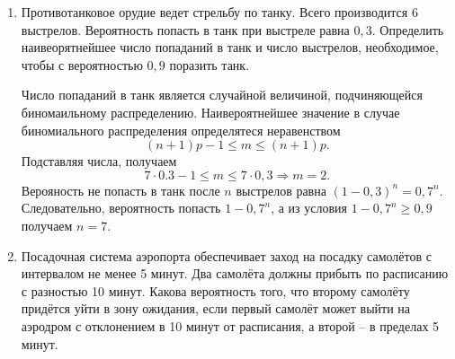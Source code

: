 \begin{enumerate}
    \item Противотанковое орудие ведет стрельбу по танку. Всего производится 6
        выстрелов. Вероятность попасть в танк при выстреле равна \( 0,3 \).
        Определить наивеорятнейшее число попаданий в танк и число выстрелов,
        необходимое, чтобы с вероятностью \( 0,9 \) поразить танк.

        Число попаданий в танк является случайной величиной, подчиняющейся
        биномаильному распределению. Наивероятнейшее значение в случае
        биномиального распределения определятеся неравенством
        \[
            (n+1)p - 1 \le m \le (n+1)p.
        \]
        Подставляя числа, получаем
        \[
            7\cdot0.3 - 1 \le m \le 7\cdot0,3 \Rightarrow m = 2.
        \]
        Верояность не попасть в танк после \( n \) выстрелов равна
        \( (1 - 0,3)^n = 0,7^n \). Следовательно, вероятность попасть
        \( 1 - 0,7^n \), а из условия \( 1 - 0,7^n \ge 0,9 \) получаем
        \( n = 7 \).

    \item Посадочная система аэропорта обеспечивает заход на посадку самолётов с
        интервалом не менее 5 минут. Два самолёта должны прибыть по расписанию с
        разностью 10 минут. Какова вероятность того, что второму самолёту
        придётся уйти в зону ожидания, если первый самолёт может выйти на
        аэродром с отклонением в 10 минут от расписания, а второй -- в пределах
        5 минут.
\end{enumerate}
